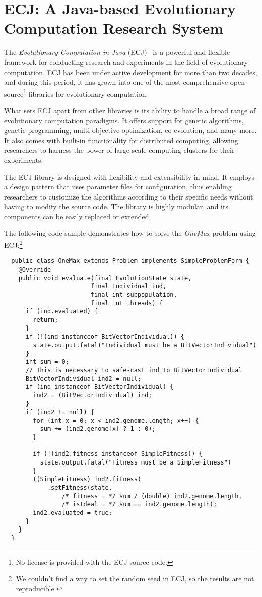 \section{ECJ: A Java-based Evolutionary Computation Research System}
\label{sec:sota:ecj}

  The \emph{Evolutionary Computation in Java} (ECJ)~\autocite{ECJ} is a powerful and flexible framework for conducting research and experiments in 
  the field of evolutionary computation.
  ECJ has been under active development for more than two decades, and during 
  this period, it has grown into one of the most comprehensive 
  open-source\footnote{No license is provided with the ECJ source code.} 
  libraries for evolutionary computation.

  What sets ECJ apart from other libraries is its ability to handle a broad 
  range of evolutionary computation paradigms.
  It offers support for genetic algorithms, genetic programming, 
  multi-objective optimization, co-evolution, and many more.
  It also comes with built-in functionality for distributed computing, allowing 
  researchers to harness the power of large-scale computing clusters for their 
  experiments.

  The ECJ library is designed with flexibility and extensibility in mind.
  It employs a design pattern that uses parameter files for configuration, thus 
  enabling researchers to customize the algorithms according to their specific 
  needs without having to modify the source code.
  The library is highly modular, and its components can be easily replaced or 
  extended.

  The following code sample demonstrates how to solve the \textit{OneMax} 
  problem using ECJ:\footnote{We couldn't find a way to set the random seed in
  ECJ, so the results are not reproducible.}

  \begin{verbatim}
  public class OneMax extends Problem implements SimpleProblemForm {
    @Override
    public void evaluate(final EvolutionState state,
                        final Individual ind,
                        final int subpopulation,
                        final int threads) {
      if (ind.evaluated) {
        return;
      }
      if (!(ind instanceof BitVectorIndividual)) {
        state.output.fatal("Individual must be a BitVectorIndividual")
      }
      int sum = 0;
      // This is necessary to safe-cast ind to BitVectorIndividual
      BitVectorIndividual ind2 = null;
      if (ind instanceof BitVectorIndividual) {
        ind2 = (BitVectorIndividual) ind;
      }
      if (ind2 != null) {
        for (int x = 0; x < ind2.genome.length; x++) {
          sum += (ind2.genome[x] ? 1 : 0);
        }

        if (!(ind2.fitness instanceof SimpleFitness)) {
          state.output.fatal("Fitness must be a SimpleFitness")
        }
        ((SimpleFitness) ind2.fitness)
            .setFitness(state,
                /* fitness = */ sum / (double) ind2.genome.length,
                /* isIdeal = */ sum == ind2.genome.length);
        ind2.evaluated = true;
      }
    }
  }
  \end{verbatim}

